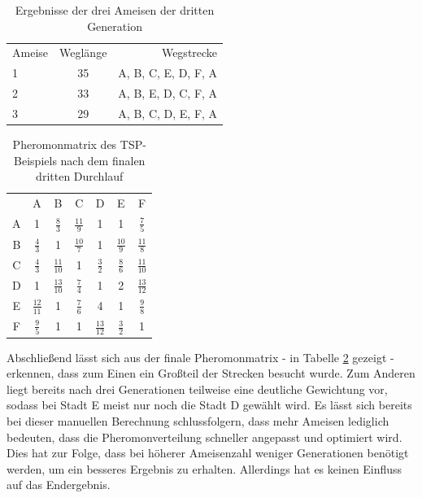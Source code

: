 	\begin{table}
		\centering
		\footnotesize
		\begin{tabular}{l c r}
			Ameise & Weglänge & Wegstrecke \\
			1 & 35 & A, B, C, E, D, F, A\\
			2 & 33 & A, B, E, D, C, F, A\\ 
			3 & 29 & A, B, C, D, E, F, A\\
		\end{tabular}
		\caption{Ergebnisse der drei Ameisen der dritten Generation}
		\label{tspAcoNumerisch_ergebnis_3}
	\end{table}

	\begin{table}
		\centering
		\footnotesize
		\begin{tabular}{c c c c c c c}
			& A & B & C & D & E & F \\
			A & 1 & $\frac{8}{3}$ & $\frac{11}{9}$ & 1 & 1 & $\frac{7}{5}$\\ 
			B & $\frac{4}{3}$ & 1 & $\frac{10}{7}$ & 1 & $\frac{10}{9}$ & $\frac{11}{8}$\\ 
			C & $\frac{4}{3}$ & $\frac{11}{10}$ & 1 & $\frac{3}{2}$ & $\frac{8}{6}$ & $\frac{11}{10}$\\
			D & 1 & $\frac{13}{10}$ & $\frac{7}{4}$ & 1 & 2 & $\frac{13}{12}$\\
			E & $\frac{12}{11}$ & 1 & $\frac{7}{6}$ & 4 & 1 & $\frac{9}{8}$\\
			F & $\frac{9}{5}$ & 1 & 1 & $\frac{13}{12}$ & $\frac{3}{2}$ & 1\\
		\end{tabular}
		\caption{Pheromonmatrix des TSP-Beispiels nach dem finalen dritten Durchlauf}
		\label{tspAcoNumerisch_pheromon_3}
	\end{table}

	Abschließend lässt sich aus der finale Pheromonmatrix - in Tabelle \ref{tspAcoNumerisch_pheromon_3} gezeigt - erkennen, dass zum Einen ein Großteil der Strecken besucht wurde. Zum Anderen liegt bereits nach drei Generationen teilweise eine deutliche Gewichtung vor, sodass bei Stadt E meist nur noch die Stadt D gewählt wird.
	Es lässt sich bereits bei dieser manuellen Berechnung schlussfolgern, dass mehr Ameisen lediglich bedeuten, dass die Pheromonverteilung schneller angepasst und optimiert wird. Dies hat zur Folge, dass bei höherer Ameisenzahl weniger Generationen benötigt werden, um ein besseres Ergebnis zu erhalten. Allerdings hat es keinen Einfluss auf das Endergebnis.